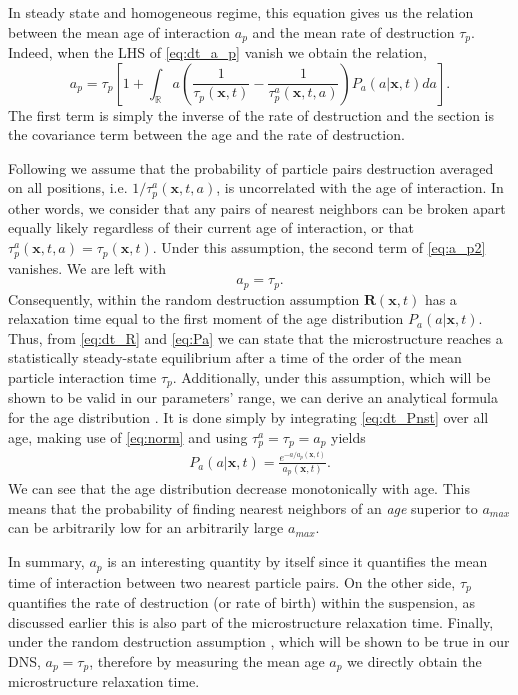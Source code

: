 In steady state and homogeneous regime, this equation gives us the relation between the mean age of interaction $a_p$ and the mean rate of destruction $\tau_p$. 
Indeed, when the LHS of \ref{eq:dt_a_p} vanish we obtain the relation,
\begin{equation}
    a_p
    = \tau_p \left[
        1
        + 
        \int_{\mathbb{R}} a\left(
            \frac{1}{\tau_p(\textbf{x},t)} 
            - \frac{1}{\tau_p^a(\textbf{x},t,a)} 
        \right) P_a(a|\textbf{x},t) da
    \right]. 
    \label{eq:a_p2}
\end{equation}
The first term is simply the inverse of the rate of destruction and the section is the covariance term between the age and the rate of destruction. 

Following \citep{zhang2023evolution} we assume that the probability of particle pairs destruction averaged on all positions, i.e. $1/\tau_p^a(\textbf{x},t,a)$, is uncorrelated with the age of interaction. 
In other words, we consider that any pairs of nearest neighbors can be broken apart equally likely regardless of their current age of interaction, or that $\tau^a_p(\textbf{x},t,a) = \tau_p(\textbf{x},t)$.
Under this assumption, the second term of \ref{eq:a_p2} vanishes. 
We are left with
\begin{equation}
    a_p = \tau_p. 
    \label{eq:a_p_eq_tau_p}
\end{equation}
Consequently, within the random destruction assumption $\textbf{R}(\textbf{x},t)$ has a relaxation time equal to the first moment of the age distribution $P_a(a|\textbf{x},t)$. 
Thus, from \ref{eq:dt_R} and \ref{eq:Pa} we can state that the microstructure reaches a statistically steady-state equilibrium after a time of the order of the mean particle interaction time $\tau_p$. 
Additionally,  under this assumption, which will be shown to be valid in our parameters' range, we can derive an analytical formula for the age distribution \citep{zhang2023evolution}. 
It is done simply by integrating \ref{eq:dt_Pnst} over all age, making use of \ref{eq:norm} and using $\tau_p^a = \tau_p = a_p$ yields
\begin{align}
    P_a(a|\textbf{x},t)  
    =\frac{e^{-a/a_p(\textbf{x},t)}}{a_p(\textbf{x},t)}.
    \label{eq:Pa}
\end{align} 
We can see that the age distribution decrease monotonically with age. 
This means that the probability of finding nearest neighbors of an \textit{age} superior to $a_{max}$ can be arbitrarily low for an arbitrarily large $a_{max}$. 

In summary, $a_p$ is an interesting quantity by itself since it quantifies the mean time of interaction between two nearest particle pairs.
On the other side, $\tau_p$ quantifies the rate of destruction (or rate of birth) within the suspension, as discussed earlier this is also part of the microstructure relaxation time. 
Finally, under the random destruction assumption \citep{zhang2023evolution}, which will be shown to be true in our DNS, $a_p  =\tau_p$, therefore by measuring the mean age $a_p$ we directly obtain the microstructure relaxation time. 
 
